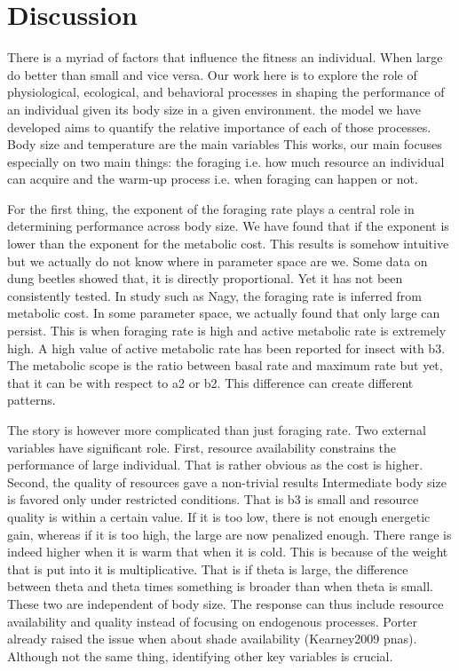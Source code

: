 \section*{Discussion}
% 
There is a myriad of factors that influence the fitness an individual.
When large do better than small and vice versa.
Our work here is to explore the role of physiological, ecological, and behavioral processes in shaping the performance of an individual given its body size in a given environment.
the model we have developed aims to quantify the relative importance of each of those processes.
Body size and temperature are the main variables
This works, our main focuses especially on two main things: the foraging i.e. how much resource an individual can acquire and the warm-up process i.e. when foraging can happen or not.


For the first thing, the exponent of the foraging rate plays a central role in determining performance across body size.
We have found that if the exponent is lower than the exponent for the metabolic cost.
This results is somehow intuitive but we actually do not know where in parameter space are we.
Some data on dung beetles showed that, it is directly proportional.
Yet it has not been consistently tested.
In study such as Nagy, the foraging rate is inferred from metabolic cost.
In some parameter space, we actually found that only large can persist. 
This is when foraging rate is high and active metabolic rate is extremely high.
A high value of active metabolic rate has been reported for insect with b3. 
The metabolic scope is the ratio between basal rate and maximum rate but yet, that it can be with respect to a2 or b2.
This difference can create different patterns.

 The story is however more complicated than just foraging rate.
 Two external variables have significant role.
 First,  resource availability constrains the performance of large individual.
 That is rather obvious as the cost is higher.
 Second, the quality of resources gave a non-trivial results
 Intermediate body size is favored only under restricted conditions. 
 That is b3 is small and resource quality is within a certain value.
 If it is too low, there is not enough energetic gain, whereas if it is too high, the large are now penalized enough.
 There range is indeed higher when it is warm that when it is cold. 
 This is because of the weight that is put into it is multiplicative. 
 That is if theta is large, the difference between theta and theta times something is broader than when theta is small.
 These two are independent of body size. 
 The response can thus include resource availability and quality instead of focusing on endogenous processes.
 Porter already raised the issue when about shade availability (Kearney2009 pnas).
 Although not the same thing, identifying other key variables is crucial.

